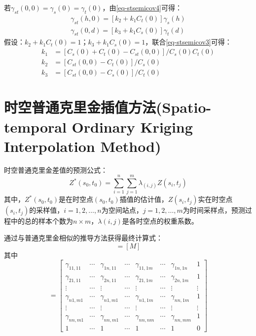 若$\gamma_{st}(0,0) = \gamma_s(0) = \gamma_t(0)$，由\cref{eq-stsemicov4}可得：
\begin{eqnarray}
    \gamma_{st}(h,0) = \left[ k_2 + k_1 C_t(0) \right]\gamma_s(h) \\
    \label{eq4.44}
    \gamma_{st}(0,d) = \left[ k_3 + k_1 C_s(0) \right]\gamma_t(d)
    \label{eq4.45}
\end{eqnarray}
假设：$k_2+k_1 C_t(0) = 1$；$k_3+k_1 C_s(0) = 1$，联合\cref{eq-stsemicov3}可得：
\begin{equation}
    \begin{split}
        k_1&=\left[ C_s(0)+C_t(0)-C_{st}(0,0) \right]/C_s(0)C_t(0)  \\
        k_2&=\left[ C_{st}(0,0)-C_t(0) \right]/C_s(0) \\
        k_3&=\left[ C_{st}(0,0)-C_s(0) \right]/C_t(0)
    \end{split}
    \label{eq-computek}
\end{equation}

\section{时空普通克里金插值方法(Spatio-temporal Ordinary Kriging Interpolation Method)}
时空普通克里金差值的预测公式：
\begin{equation}
    Z^*(s_0,t_0) = \sum\limits_{i=1}^{n}\sum\limits_{j=1}^{m}\lambda_{(i,j)}Z(s_i,t_j)
    \label{eq-anticipateKriginInterpolation}
\end{equation}
其中，$Z^*(s_0,t_0)$是在时空点$(s_0,t_0)$插值的估计值，$Z(s_i,t_j)$实在时空点$(s_i,t_j)$的采样值，$i=1,2,\dots,n$为空间站点，$j=1,2,\dots,m$为时间采样点，预测过程中的总的样本个数为$n\times m$，$\lambda(i,j)$是各时空点的权重系数。

通过与普通克里金相似的推导方法获得最终计算式：
\begin{equation}
    [K][\lambda]=[M]
    \label{eq-finalKriginInterpolation}
\end{equation}
其中
\begin{equation*}
    [K] = \left[ 
        \begin{array}{cccccccc}
            \gamma_{11,11} & \cdots & \gamma_{1n,11} & \cdots & \gamma_{11,1m} & \cdots & \gamma_{1n,1n} & 1\\
            \gamma_{21,11} & \cdots & \gamma_{2n,11} & \cdots & \gamma_{21,1m} & \cdots & \gamma_{2n,1m} & 1\\
            \vdots & \cdots & \vdots & \cdots & \vdots & \cdots & \vdots & \vdots\\
            \gamma_{n1,m1} & \cdots & \gamma_{n1,m1} & \cdots & \gamma_{n1,1m} & \cdots & \gamma_{nn,1m} & 1\\
            \vdots & \cdots & \vdots & \cdots & \vdots & \cdots & \vdots & \vdots\\
            \gamma_{nn,m1} & \cdots & \gamma_{nn,m1} & \cdots & \gamma_{nn,nm} & \cdots & \gamma_{nn,mm} & 1\\
            1 & \cdots & 1 & \cdots & 1 & \cdots & 1 & 0
        \end{array}
    \right]
\end{equation*}

